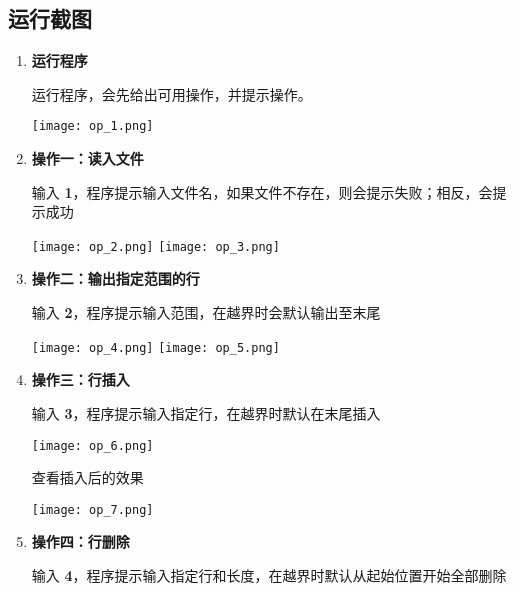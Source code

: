     \subsection{运行截图}
        \begin{enumerate}
            \item \textbf{运行程序}
                \par 运行程序，会先给出可用操作，并提示操作。
                \begin{figure*}[htbp]
                    \centering
                    \texttt{[image: op\_1.png]}
                \end{figure*}
            \item \textbf{操作一：读入文件}
                \par 输入 \textbf{1}，程序提示输入文件名，如果文件不存在，则会提示失败；相反，会提示成功
                \begin{figure*}[htbp]
                    \centering
                    \texttt{[image: op\_2.png]}
                    \texttt{[image: op\_3.png]}
                \end{figure*}
            \item \textbf{操作二：输出指定范围的行}
                \par 输入 \textbf{2}，程序提示输入范围，在越界时会默认输出至末尾
                \begin{figure*}[htbp]
                    \centering
                    \texttt{[image: op\_4.png]}
                    \texttt{[image: op\_5.png]}
                \end{figure*}
            \item \textbf{操作三：行插入}
                \par 输入 \textbf{3}，程序提示输入指定行，在越界时默认在末尾插入
                \begin{figure*}[htbp]
                    \centering
                    \texttt{[image: op\_6.png]}
                \end{figure*}
                \newpage
                \par 查看插入后的效果
                \begin{figure*}[htbp]
                    \centering
                    \texttt{[image: op\_7.png]}
                \end{figure*}
            \item \textbf{操作四：行删除}
                \par 输入 \textbf{4}，程序提示输入指定行和长度，在越界时默认从起始位置开始全部删除

\end{enumerate}
